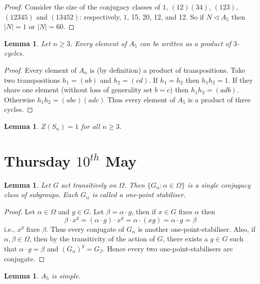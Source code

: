 \documentclass[a4paper,10pt]{article}
\newtheorem{Lem}[thm]{Lemma}
\begin{document}
\begin{proof}
Consider the size of the conjugacy classes of $1$, $(12)(34)$, $(123)$, $(12345)$ and $(13452)$: respectively, $1$, 15, 20, 12, and 12.
So if $N \triangleleft A_5$ then $|N| = 1$ or $|N| = 60$. 
\end{proof}

\begin{Lem}
Let $n \geq 3$. Every element of $A_5$ can be written as a product of $3$-cycles.
\end{Lem}

\begin{proof}
Every element of $A_n$ is (by definition) a product of transpositions. Take two transpositions $h_1 = (ab)$ and $h_2 = (cd)$. If $h_1 = h_2$ then $h_1h_2 = 1$. If they share one element (without loss of generality set $b=c$) then $h_1h_2 = (adb)$. Otherwise $h_1h_2 = (abc)(adc)$ Thus every element of $A_5$ is a product of three cycles. 
\end{proof}

\begin{Lem}
$Z(S_n) = 1$ for all $n \geq 3$.
\end{Lem}


\newpage
\section{Thursday $10^{th}$ May}


\begin{Lem}
Let $G$ act transitively on $\Omega$. Then $\{ G_\alpha : \alpha \in \Omega \}$ is a single conjugacy class of subgroups. Each $G_\alpha$ is called a one-point stabiliser. 
\end{Lem}

\begin{proof}
Let $\alpha \in \Omega$ and $g \in G$. Let $\beta = \alpha \cdot g$, then if $x \in G$ fixes $\alpha$ then
\[ \beta \cdot x^g = (\alpha \cdot g) \cdot x^g = \alpha \cdot (xg) = \alpha \cdot g = \beta\]
i.e., $x^g$ fixes $\beta$. Thus every conjugate of $G_\alpha$ is another one-point-stabiliser. Also, if $\alpha, \beta \in \Omega$, then by the transitivity of the action of $G$, there exists a $g \in G$ such that $\alpha \cdot g = \beta$ and $(G_\alpha )^g = G_\beta$. Hence every two one-point-stabilisers are conjugate. 
\end{proof}

\begin{Lem}
$A_5$ is simple.
\end{Lem}
\end{document}
